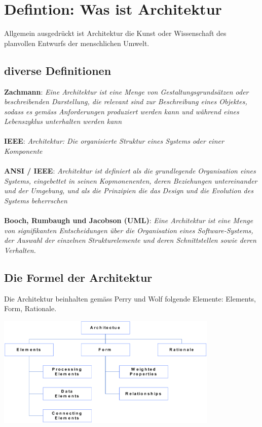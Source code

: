 \documentclass{report}
\newenvironment{Figure}
	{\par\medskip\noindent\minipage{\linewidth}}
	{\endminipage\par\medskip}
\theoremstyle{definition}
\theoremstyle{example}
\begin{document}
\section{Defintion: Was ist Architektur}
Allgemein ausgedrückt ist Architektur die Kunst oder Wissenschaft des planvollen Entwurfs der menschlichen Umwelt.

\subsection{diverse Definitionen}
\textbf{Zachmann}: \textit{Eine Architektur ist eine Menge von Gestaltungsgrundsätzen oder beschreibenden Darstellung, die relevant sind zur Beschreibung eines Objektes, sodass es gemäss Anforderungen produziert werden kann und während eines Lebenszyklus unterhalten werden kann}\\
\\
\textbf{IEEE}: \textit{Architektur: Die organisierte Struktur eines Systems oder einer Komponente}\\
\\
\textbf{ANSI / IEEE}: \textit{Architektur ist definiert als die grundlegende Organisation eines Systems, eingebettet in seinen Kopmonenenten, deren Beziehungen untereinander und der Umgebung, und als die Prinzipien die das Design und die Evolution des Systems beherrschen}\\
\\
\textbf{Booch, Rumbaugh und Jacobson (UML)}: \textit{Eine Architektur ist eine Menge von signifikanten Entscheidungen über die Organisation eines Software-Systems, der Auswahl der einzelnen Strukturelemente und deren Schnittstellen sowie deren Verhalten.}

\subsection{Die Formel der Architektur}
Die Architektur beinhalten gemäss Perry und Wolf folgende Elemente: Elements, Form, Rationale.
\begin{Figure}
\centering
\includegraphics[width=400px]{img/ArchitekturFormel.png}
	\label{fig:Architektur-Formel}
\end{Figure}
\end{document}
